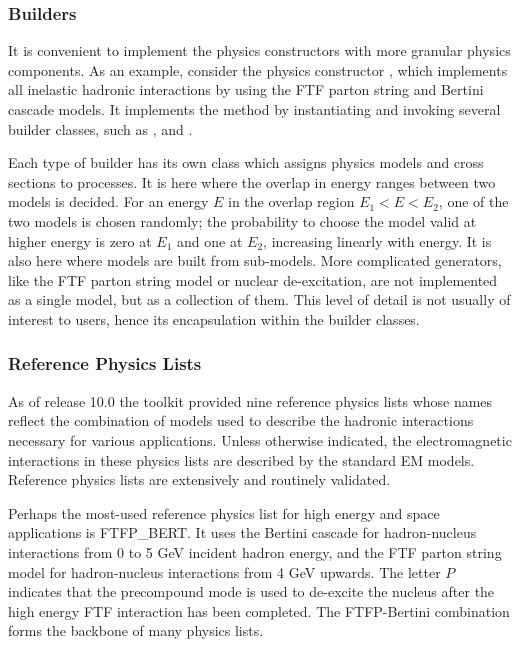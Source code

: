 \subsubsection{Builders}
It is convenient to implement the physics constructors with more granular physics
components.  As an example, consider the physics constructor 
, which implements all inelastic hadronic 
interactions by using the FTF parton string and Bertini cascade models.  It 
implements the  method by
instantiating and invoking several builder classes, such as 
,
 and .  

Each type of builder has its own class which assigns physics models and cross 
sections to processes.  It is here where the overlap in energy ranges between 
two models is decided.  For an energy $E$ in the overlap region $E_1 < E < E_2$,
one of the two models is chosen randomly; the probability to choose the model 
valid at higher energy is zero at $E_1$ and one at $E_2$, increasing linearly 
with energy.  It is also here where models are built from sub-models.  More 
complicated generators, like the FTF parton string model or nuclear 
de-excitation, are not implemented as a single model, but as a collection of 
them.  This level of detail is not usually of interest to users, hence its 
encapsulation within the builder classes.

\subsubsection{Reference Physics Lists}
As of release 10.0 the toolkit provided nine reference physics lists whose names
reflect the combination of models used to describe the hadronic interactions 
necessary for various applications.  Unless otherwise indicated, the 
electromagnetic interactions in these physics lists are described by the 
\Gfour{} standard EM models.  Reference physics lists are extensively and 
routinely validated.    

Perhaps the most-used reference physics list for high energy and space 
applications is FTFP\_BERT.  It uses the \Gfour{} Bertini cascade for 
hadron-nucleus interactions from 0 to 5 GeV incident hadron energy, and the FTF
parton string model for hadron-nucleus interactions from 4 GeV upwards.  The 
letter $P$ indicates that the \Gfour{} precompound mode is used to de-excite 
the nucleus after the high energy FTF interaction has been completed.  The 
FTFP-Bertini combination forms the backbone of many physics lists. 

